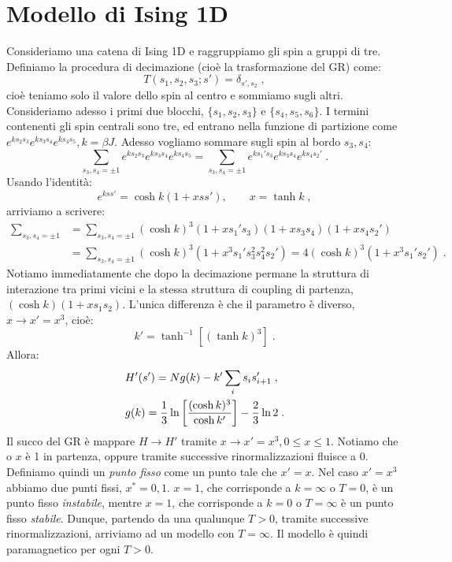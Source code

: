 \documentclass[10pt,a4paper]{report}
\theoremstyle{definition}
\numberwithin{equation}{section}
\begin{document}
\section{Modello di Ising 1D}
Consideriamo una catena di Ising 1D e raggruppiamo gli spin a gruppi di tre. Definiamo la procedura di decimazione (cioè la trasformazione del GR) come:
\begin{equation}
T(s_1,s_2,s_3;s')=\delta_{s',s_2}\;,
\end{equation}
cioè teniamo solo il valore dello spin al centro e sommiamo sugli altri. Consideriamo adesso i primi due blocchi, $\{s_1,s_2,s_3\}$ e $\{s_4,s_5,s_6\}$. I termini contenenti gli spin centrali sono tre, ed entrano nella funzione di partizione come $e^{ks_2s_3}e^{ks_3s_4}e^{ks_4s_5}, k=\beta J$. Adesso vogliamo sommare sugli spin al bordo $s_3,s_4$:
\begin{equation}
\sum_{s_3,s_4=\pm 1}e^{ks_2s_3}e^{ks_3s_4}e^{ks_4s_5}=\sum_{s_3,s_4=\pm 1}e^{ks_1's_3}e^{ks_3s_4}e^{ks_4s_2'}\;.
\end{equation}
Usando l'identità:
\begin{equation}
e^{kss'}=\cosh k(1+xss'),\qquad x=\tanh k\;,
\end{equation}
arriviamo a scrivere:
\begin{align}
\sum_{s_3,s_4=\pm 1} &=\sum_{s_3,s_4=\pm 1}(\cosh k)^3(1+xs_1's_3)(1+xs_3s_4)(1+xs_4s_2') \\
&=\sum_{s_3,s_4=\pm 1}(\cosh k)^3(1+x^3s_1's_3^2s_4^2s_2') = 4(\cosh k)^3(1+x^3s_1's_2')\;.
\end{align}
Notiamo immediatamente che dopo la decimazione permane la struttura di interazione tra primi vicini e la stessa struttura di coupling di partenza, $(\cosh k)(1+xs_1s_2)$. L'unica differenza è che il parametro è diverso, $x\to x'=x^3$, cioè:
\begin{equation}
k'=\tanh^{-1}[(\tanh k)^3]\;.
\end{equation}
Allora:
\begin{align}
&H'(s')=Ng(k)-k'\sum_is_is_{i+1}' \;, \notag \\
&g(k)=\frac{1}{3}\ln\left[\frac{(\cosh k)^3}{\cosh k'}\right]-\frac{2}{3}\ln 2\;.
\end{align}
Il succo del GR è mappare $H\to H'$ tramite $x\to x'=x^3, 0\le x\le 1$. Notiamo che o $x$ è 1 in  partenza, oppure tramite successive rinormalizzazioni fluisce a 0. Definiamo quindi un \emph{punto fisso} come un punto tale che $x'=x$. Nel caso $x'=x^3$ abbiamo due punti fissi, $x^*=0,1$. $x=1$, che corrisponde a $k=\infty$ o $T=0$, è un punto fisso \emph{instabile}, mentre $x=1$, che corrisponde a $k=0$ o $T=\infty$ è un punto fisso \emph{stabile}. Dunque, partendo da una qualunque $T>0$, tramite successive rinormalizzazioni, arriviamo ad un modello con $T=\infty$. Il modello è quindi paramagnetico per ogni $T>0$.
\end{document}
